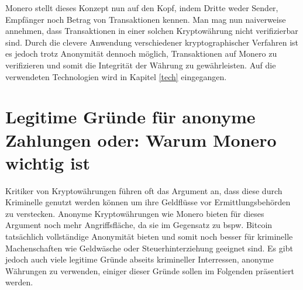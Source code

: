 Monero stellt dieses Konzept nun auf den Kopf, indem Dritte weder Sender, Empfänger noch Betrag von Transaktionen kennen. Man mag nun naiverweise annehmen, dass Transaktionen
in einer solchen Kryptowährung nicht verifizierbar sind. Durch die clevere Anwendung verschiedener kryptographischer Verfahren ist es jedoch trotz Anonymität dennoch möglich, Transaktionen
auf Monero zu verifizieren und somit die Integrität der Währung zu gewährleisten. Auf die verwendeten Technologien wird in Kapitel \ref{tech} eingegangen.

\chapter{Legitime Gründe für anonyme Zahlungen oder: Warum Monero wichtig ist} \label {reasons}
Kritiker von Kryptowährungen führen oft das Argument an, dass diese durch Kriminelle genutzt werden können um ihre Geldflüsse vor Ermittlungsbehörden zu verstecken. Anonyme Kryptowährungen wie Monero 
bieten für dieses Argument noch mehr Angriffsfläche, da sie im Gegensatz zu bspw. Bitcoin tatsächlich vollständige Anonymität bieten und somit noch besser für kriminelle Machenschaften wie Geldwäsche oder
Steuerhinterziehung geeignet sind. Es gibt jedoch auch viele legitime Gründe abseits krimineller Interressen, anonyme Währungen zu verwenden, einiger dieser Gründe sollen im Folgenden präsentiert werden.
